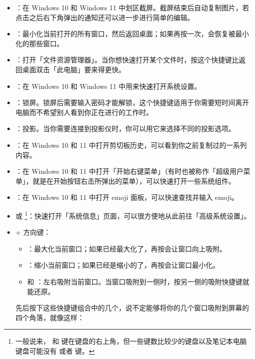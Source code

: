 \begin{itemize}
  \item {}：在 Windows 10 和 Windows 11 中划区截屏。截屏结束后自动复制图片，若点击之后右下角弹出的通知还可以进一步进行简单的编辑。
  \item {}：最小化当前打开的所有窗口，然后返回桌面；如果再按一次，会恢复被最小化的那些窗口。
  \item {}：打开「文件资源管理器」。当你想快速打开某个文件时，按这个快捷键比返回桌面双击「此电脑」要来得更快。
  \item {}：在 Windows 10 和 Windows 11 中用来快速打开系统设置。
  \item {}：锁屏。锁屏后需要输入密码才能解锁，这个快捷键适用于你需要短时间离开电脑而不希望别人看到你正在进行的工作时。
  \item {}：投影。当你需要连接到投影仪时，你可以用它来选择不同的投影选项。
  \item {}：在 Windows 10 和 11 中打开剪切板历史，可以看到你之前复制过的一系列内容。
  \item {}：在 Windows 10 和 11 中打开「开始右键菜单」（有时也被称作「超级用户菜单」，就是在开始按钮右击所弹出的菜单），可以快速打开一些系统组件。
  \item \keys{\Windows + ;}：在 Windows 10 和 11 中打开 emoji 面板，可以快速查找并输入 emoji。
  \item {} 或 \footnote{一般说来， 和  键在键盘的右上角，但一些键数比较少的键盘以及笔记本电脑键盘可能没有  或者  键。}：快速打开「系统信息」页面，可以很方便地从此前往「高级系统设置」。
  \item \keys{\Windows} + 方向键：
  \begin{itemize}
    \item {}：最大化当前窗口；如果已经最大化了，再按会让窗口向上吸附。
    \item {}：缩小当前窗口；如果已经是缩小的了，再按会让窗口最小化。
    \item {} 和 ：左右吸附当前窗口。当窗口吸附到一侧时，按另一侧的吸附快捷键就能还原。
  \end{itemize}

  先后按下这些快捷键组合中的几个，说不定能够将你的几个窗口吸附到屏幕的四个角落，就像这样：


\end{itemize}
